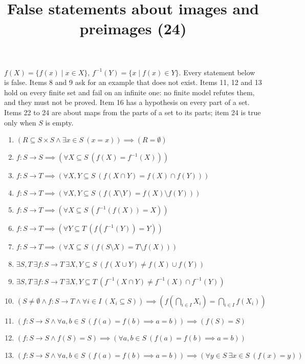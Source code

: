 \documentclass[11pt,a4paper]{article}
\title{False statements about images and preimages (24)}
\author{}
\date{}
\begin{document}
\maketitle
$f(X) = \{f(x) \mid x \in X\}$, $f^{-1}(Y) = \{x \mid f(x) \in Y\}$. Every statement below is false. Items 8 and 9 ask for an example that does not exist. Items 11, 12 and 13 hold on every finite set and fail on an infinite one: no finite model refutes them, and they must not be proved. Item 16 has a hypothesis on every part of a set. Items 22 to 24 are about maps from the parts of a set to its parts; item 24 is true only when $S$ is empty.

\begin{enumerate}
\item $\displaystyle (R \subseteq S \times S \land \exists x \in S\ (x = x)) \implies (R = \emptyset)$
\item $\displaystyle f \colon S \to S \implies (\forall X \subseteq S\ (f(X) = f^{-1}(X)))$
\item $\displaystyle f \colon S \to T \implies (\forall X, Y \subseteq S\ (f(X \cap Y) = f(X) \cap f(Y)))$
\item $\displaystyle f \colon S \to T \implies (\forall X, Y \subseteq S\ (f(X \setminus Y) = f(X) \setminus f(Y)))$
\item $\displaystyle f \colon S \to T \implies (\forall X \subseteq S\ (f^{-1}(f(X)) = X))$
\item $\displaystyle f \colon S \to T \implies (\forall Y \subseteq T\ (f(f^{-1}(Y)) = Y))$
\item $\displaystyle f \colon S \to T \implies (\forall X \subseteq S\ (f(S \setminus X) = T \setminus f(X)))$
\item $\displaystyle \exists S, T\ \exists f \colon S \to T\ \exists X, Y \subseteq S\ (f(X \cup Y) \neq f(X) \cup f(Y))$
\item $\displaystyle \exists S, T\ \exists f \colon S \to T\ \exists X, Y \subseteq T\ (f^{-1}(X \cap Y) \neq f^{-1}(X) \cap f^{-1}(Y))$
\item $\displaystyle (S \neq \emptyset \land f \colon S \to T \land \forall i \in I\ (X_{i} \subseteq S)) \implies (f(\bigcap_{i \in I} X_{i}) = \bigcap_{i \in I} f(X_{i}))$
\item $\displaystyle (f \colon S \to S \land \forall a, b \in S\ (f(a) = f(b) \implies a = b)) \implies (f(S) = S)$
\item $\displaystyle (f \colon S \to S \land f(S) = S) \implies (\forall a, b \in S\ (f(a) = f(b) \implies a = b))$
\item $\displaystyle (f \colon S \to S \land \forall a, b \in S\ (f(a) = f(b) \implies a = b)) \implies (\forall y \in S\ \exists x \in S\ (f(x) = y))$

\end{enumerate}
\end{document}
